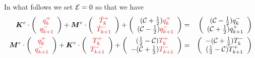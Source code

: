 In what follows we set ${\cal E}=0$ so that we have
\begin{eqnarray}
{\bm K}^e \cdot 
\left( 
\begin{array}{cc}
    {\color{red}q_k^+}  \\
    {\color{red}q_{k+1}^-}
\end{array}
\right)
+
{\bm M}^e \cdot 
\left(
\begin{array}{c}
{\color{red}\dot{T}_k^+}  \\
{\color{red}\dot{T}_{k+1}^-} 
\end{array}
\right) 
+ 
\left(
\begin{array}{cc}
     ({\cal C}+\frac{1}{2})  {\color{red}q_k^+}  \\
     ({\cal C}-\frac{1}{2})  {\color{red}q_{k+1}^-} 
\end{array}
\right)
&=& 
\left(
\begin{array}{cc}
     ({\cal C}-\frac{1}{2}) q_k^-  \\
     ({\cal C}+\frac{1}{2}) q_{k+1}^+ 
\end{array}
\right)
\nonumber
\\
{\bm M}^e \cdot
\left(
\begin{array}{cc}
    {\color{red}q_k^+}  \\
    {\color{red}q_{k+1}^-}
\end{array}
\right)+
{\bm K}^e \cdot
\left(
\begin{array}{cc}
 {\color{red}T_k^+}  \\
{\color{red}T_{k+1}^-} 
\end{array}
\right) 
+ \left(
\begin{array}{cc}
     (\frac{1}{2}-{\cal C}) {\color{red}T_k^+}  \\
     -({\cal C}+\frac{1}{2}){\color{red}T_{k+1}^-} 
\end{array}
\right)
&=& \left(
\begin{array}{cc}
     -({\cal C}+\frac{1}{2})  T_k^- \\
     (\frac{1}{2}-{\cal C})  T_{k+1}^+ 
\end{array}
\right) 
\end{eqnarray}

